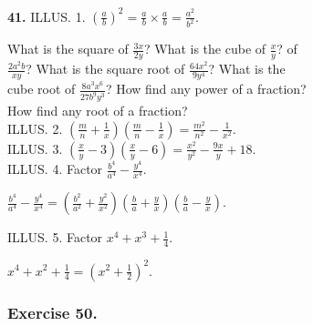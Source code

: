 \documentclass{book}
\begin{document}
\textbf{ 41.} ILLUS. 1. $\displaystyle \left(\frac{a}{b}\right)^2
= \frac{a}{b} \times \frac{a}{b} = \frac{a^2}{b^2}$.

What is the square of $\frac{3x}{2y}$? What is the cube of $\frac{x}{y}$? of\\
$\frac{2a^2b}{xy}$? What is the square root of $\frac{64x^2}{9y^4}$? What is the\\
cube root of $\frac{8a^3x^6}{27b^9y^3}$? How find any power of a fraction?\\
How find any root of a fraction?\\

ILLUS. 2. $\displaystyle \left(\frac{m}{n} + \frac{1}{x}\right)\left(\frac{m}{n} - \frac{1}{x}\right) = \frac{m^2}{n^2} - \frac{1}{x^2}$.\\


ILLUS. 3. $\displaystyle \left(\frac{x}{y} - 3\right)\left(\frac{x}{y} - 6\right) = \frac{x^2}{y^2} - \frac{9x}{y} + 18$.\\

ILLUS. 4. Factor $ \frac{b^4}{a^4} - \frac{y^4}{x^4}$.\\
\begin{center}
$\displaystyle \frac{b^4}{a^4} - \frac{y^4}{x^4} =
\left(\frac{b^2}{a^2} + \frac{y^2}{x^2}\right) \left(\frac{b}{a} +
\frac{y}{x}\right) \left( \frac{b}{a} - \frac{y}{x}\right)$.
\end{center}

ILLUS. 5. Factor $x^4 + x^3 + \frac{1}{4}$.
\begin{center}
$\displaystyle x^4 + x^2 + \frac{1}{4} = \left(x^2 +
\frac{1}{2}\right)^2$.
\end{center}

\subsubsection*{Exercise 50.}
\end{document}
